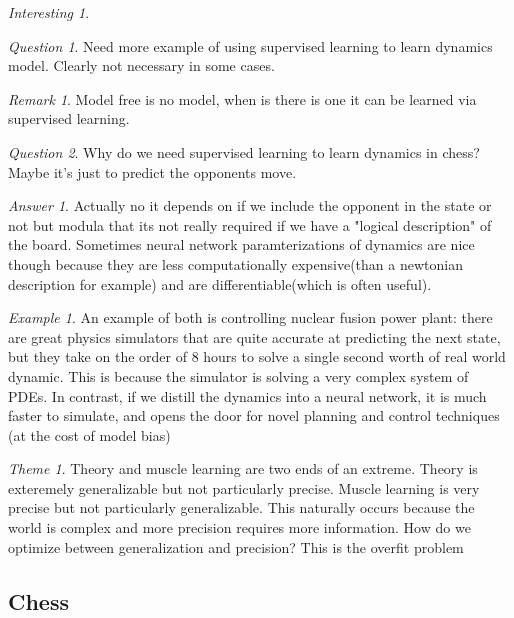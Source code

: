 \documentclass[11pt]{article}
\theoremstyle{remark}
\newtheorem{remark}{Remark}
\newtheorem{quest}{Question}
\newtheorem{ans}{Answer}
\newtheorem{interest}{Interesting}
\newtheorem{theme}{Theme}
\newtheorem{example}{Example}
\begin{document}
\begin{interest}
\begin{quest}
	Need more example of using supervised learning to learn dynamics model. Clearly not necessary in some cases.
\end{quest}

\begin{remark}
	Model free is no model, when is there is one it can be learned via supervised learning.
\end{remark}

\begin{quest}
	Why do we need supervised learning to learn dynamics in chess? Maybe it's just to predict the opponents move. 
\end{quest}

\begin{ans}
	Actually no it depends on if we include the opponent in the state or not but modula that its not really required if we have a "logical description" of the board. Sometimes neural network paramterizations of dynamics are nice though because they are less computationally expensive(than a newtonian description for example) and are differentiable(which is often useful).
\end{ans}

\begin{example}
	An example of both is controlling nuclear fusion power plant: there are great physics simulators that are quite accurate at predicting the next state, but they take on the order of 8 hours to solve a single second worth of real world dynamic. This is because the simulator is solving a very complex system of PDEs. In contrast, if we distill the dynamics into a neural network, it is much faster to simulate, and opens the door for novel planning and control techniques (at the cost of model bias)
\end{example}

\begin{theme}
	Theory and muscle learning are two ends of an extreme. Theory is exteremely generalizable but not particularly precise. Muscle learning is very precise but not particularly generalizable. This naturally occurs because the world is complex and more precision requires more information. How do we optimize between generalization and precision? This is the overfit problem
\end{theme}

\subsection{Chess}



\end{interest}
\end{document}
